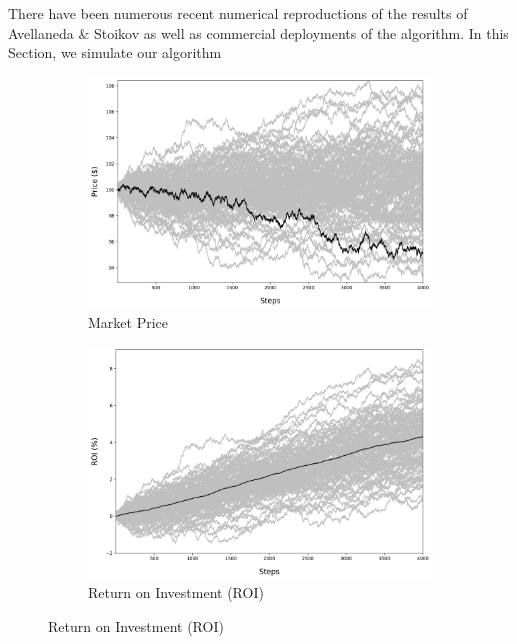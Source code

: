 \documentclass{article}
\begin{document}
There have been numerous recent numerical reproductions of the results of Avellaneda \& Stoikov \cite{fushimi2018optimal} as well as commercial deployments of the algorithm. In this Section, we simulate our algorithm 

\begin{figure}
    \centering
    \begin{subfigure}[b]{0.475\textwidth}
        \centering
        \includegraphics[width=\textwidth]{market_price.png}
        \caption[Market Price]
        {{Market Price}}
        \label{fig:ex1-market_price}
    \end{subfigure}
    \hfill
    \begin{subfigure}[b]{0.475\textwidth}  
        \centering 
        \includegraphics[width=\textwidth]{roi.png}
        \caption[Return on Investment (ROI)]
        {{Return on Investment (ROI)}}    
        \label{fig:ex1-roi}

\end{subfigure}
\end{figure}
\end{document}
